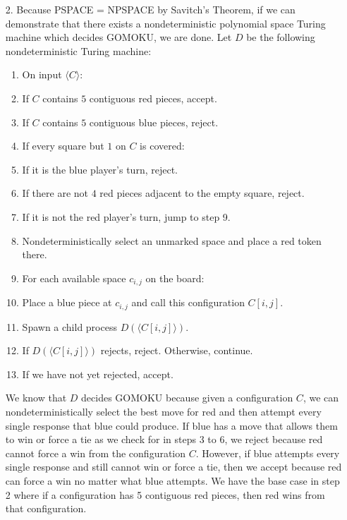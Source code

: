\documentclass[11pt, reqno]{amsart}
\theoremstyle{plain}
\theoremstyle{definition}
\newcounter{r}
\def\tab{\hspace{10pt}}
\begin{document}
\begin{enumerate}
  \item[2.] Because PSPACE = NPSPACE by Savitch's Theorem, if we can demonstrate
    that there exists a nondeterministic polynomial space Turing machine which
    decides GOMOKU, we are done. Let $D$ be the following nondeterministic
    Turing machine:
    \begin{enumerate}[1.]
      \item On input $\langle C\rangle$:
      \item \tab If $C$ contains $5$ contiguous red pieces, accept.
      \item \tab If $C$ contains $5$ contiguous blue pieces, reject.
      \item \tab If every square but $1$ on $C$ is covered:
      \item \tab\tab If it is the blue player's turn, reject.
      \item \tab\tab If
        there are not $4$ red pieces adjacent to the empty square, reject.
      \item \tab If it is not the red player's turn, jump to step 9.
      \item \tab Nondeterministically select an unmarked space and place a red
        token there.
      \item \tab For each available space $c_{i, j}$ on the board:
      \item \tab\tab Place a blue piece at $c_{i, j}$ and call this
        configuration $C[i,j]$.
      \item \tab\tab Spawn a child process $D(\langle C[i,j]\rangle)$.
      \item \tab\tab If $D(\langle C[i, j]\rangle)$ rejects, reject. Otherwise,
        continue.
      \item \tab If we have not yet rejected, accept.
    \end{enumerate}
    We know that $D$ decides GOMOKU because given a configuration $C$, we can
    nondeterministically select the best move for red and then attempt every
    single response that blue could produce. If blue has a move that allows
    them to win or force a tie as we check for in steps 3 to 6, we reject
    because red cannot force a win from the configuration $C$. However, if blue
    attempts every single response and still cannot win or force a tie, then we
    accept because red can force a win no matter what blue attempts. We have
    the base case in step 2 where if a configuration has 5 contiguous red
    pieces, then red wins from that configuration.


\end{enumerate}
\end{document}
